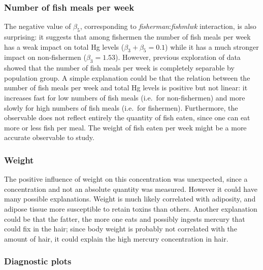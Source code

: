 \documentclass[12pt,]{article}
\begin{document}
\subsubsection{Number of fish meals per
week}\label{number-of-fish-meals-per-week}

The negative value of \(\beta_5\), corresponding to
\emph{fisherman}:\emph{fishmlwk} interaction, is also surprising: it
suggests that among fishermen the number of fish meals per week has a
weak impact on total Hg levels (\(\beta_3+\beta_5 = 0.1\)) while it has
a much stronger impact on non-fishermen (\(\beta_3 = 1.53\)). However,
previous exploration of data showed that the number of fish meals per
week is completely separable by population group. A simple explanation
could be that the relation between the number of fish meals per week and
total Hg levels is positive but not linear: it increases fast for low
numbers of fish meals (i.e.~for non-fishermen) and more slowly for high
numbers of fish meals (i.e.~for fishermen). Furthermore, the observable
does not reflect entirely the quantity of fish eaten, since one can eat
more or less fish per meal. The weight of fish eaten per week might be a
more accurate observable to study.

\subsubsection{Weight}\label{weight}

The positive influence of weight on this concentration was unexpected,
since a concentration and not an absolute quantity was measured. However
it could have many possible explanations. Weight is much likely
correlated with adiposity, and adipose tissue more susceptible to retain
toxins than others. Another explanation could be that the fatter, the
more one eats and possibly ingests mercury that could fix in the hair;
since body weight is probably not correlated with the amount of hair, it
could explain the high mercury concentration in hair.

\subsubsection{Diagnostic plots}\label{diagnostic-plots}
\end{document}
